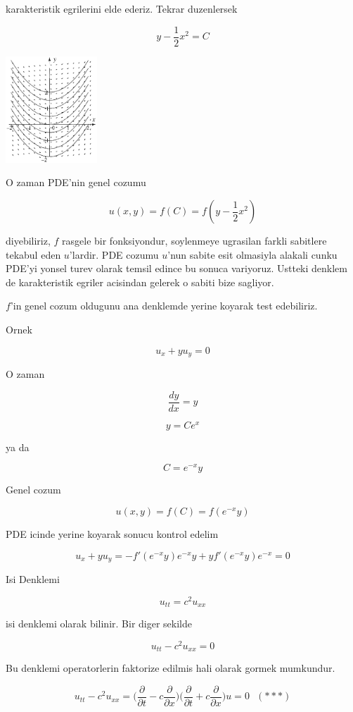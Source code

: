 \documentclass[12pt,fleqn]{article}
\begin{document}
karakteristik egrilerini elde ederiz. Tekrar duzenlersek

\[ y - \frac{1}{2}x^2 = C \]

\includegraphics[height=4cm]{2_1.png}

O zaman PDE'nin genel cozumu 

\[ u(x,y) = f(C) = f(y - \frac{1}{2}x^2) \]

diyebiliriz, $f$ rasgele bir fonksiyondur, soylenmeye ugrasilan farkli
sabitlere tekabul eden $u$'lardir. PDE cozumu $u$'nun sabite esit olmasiyla
alakali cunku PDE'yi yonsel turev olarak temsil edince bu sonuca
variyoruz. Ustteki denklem de karakteristik egriler acisindan gelerek o
sabiti bize sagliyor.

$f$'in genel cozum oldugunu ana denklemde yerine koyarak test edebiliriz.

Ornek 

\[ u_x + yu_y = 0 \]

O zaman 

\[ \frac{dy}{dx} = y \]

\[ y = Ce^x \]

ya da

\[  C = e^{-x}y\]

Genel cozum 

\[ u(x,y) = f(C) = f(e^{-x}y) \]

PDE icinde yerine koyarak sonucu kontrol edelim

\[ u_x + yu_y = 
-f'(e^{-x}y)e^{-x}y + y f'(e^{-x}y) e^{-x} = 0
 \]

Isi Denklemi 

\[ u_{tt} = c^2 u_{xx} \]

isi denklemi olarak bilinir. Bir diger sekilde 

\[ u_{tt} - c^2 u_{xx} = 0\]

Bu denklemi operatorlerin faktorize edilmis hali olarak gormek mumkundur. 

\[ u_{tt} - c^2 u_{xx} = 
\bigg( \frac{\partial }{\partial t} - c \frac{\partial }{\partial x} \bigg)
\bigg( \frac{\partial }{\partial t} + c \frac{\partial }{\partial x} \bigg)
u = 0
\ \ \ (***)
\]
\end{document}

